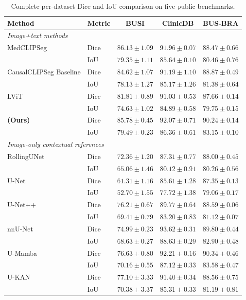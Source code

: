 \begin{table}[p]
\centering
\begin{singlespace}
\renewcommand{\arraystretch}{0.89}
\caption{Complete per-dataset Dice and IoU comparison on five public benchmarks.}
\label{tab:supp_full_model_comparison}
\scriptsize
\setlength{\tabcolsep}{2.9pt}
\begin{tabular}{@{}llccc@{}}
\toprule
Method & Metric & BUSI & ClinicDB & BUS-BRA \\
\midrule
\multicolumn{5}{l}{\textit{Image+text methods}} \\
MedCLIPSeg & Dice & $\mathbf{86.13\pm1.09}$ & $\underline{91.96\pm0.07}$ & $88.47\pm0.66$ \\
 & IoU & $\underline{79.35\pm1.11}$ & $\underline{85.64\pm0.10}$ & $80.46\pm0.76$ \\
CausalCLIPSeg Baseline & Dice & $84.62\pm1.07$ & $91.19\pm1.10$ & $\underline{88.87\pm0.49}$ \\
 & IoU & $78.13\pm1.27$ & $85.17\pm1.26$ & $\underline{81.38\pm0.64}$ \\
LViT & Dice & $81.81\pm0.89$ & $91.03\pm0.53$ & $87.66\pm0.14$ \\
 & IoU & $74.63\pm1.02$ & $84.89\pm0.58$ & $79.75\pm0.15$ \\
\textbf{\methodname{} (Ours)} & Dice & $\underline{85.78\pm0.45}$ & $\mathbf{92.07\pm0.71}$ & $\mathbf{90.24\pm0.14}$ \\
 & IoU & $\mathbf{79.49\pm0.23}$ & $\mathbf{86.36\pm0.61}$ & $\mathbf{83.15\pm0.10}$ \\
\midrule
\multicolumn{5}{l}{\textit{Image-only contextual references}} \\
RollingUNet & Dice & $72.36\pm1.20$ & $87.31\pm0.77$ & $88.00\pm0.45$ \\
 & IoU & $65.06\pm1.46$ & $80.12\pm0.91$ & $80.26\pm0.56$ \\
U-Net & Dice & $61.31\pm1.16$ & $85.61\pm1.28$ & $87.35\pm0.13$ \\
 & IoU & $52.70\pm1.55$ & $77.72\pm1.38$ & $79.06\pm0.17$ \\
U-Net++ & Dice & $76.21\pm0.67$ & $89.77\pm0.64$ & $88.59\pm0.06$ \\
 & IoU & $69.41\pm0.79$ & $83.20\pm0.83$ & $81.12\pm0.07$ \\
nnU-Net & Dice & $74.99\pm0.23$ & $\mathbf{93.62\pm0.31}$ & $\underline{89.80\pm0.44}$ \\
 & IoU & $68.63\pm0.27$ & $\mathbf{88.63\pm0.29}$ & $\underline{82.90\pm0.48}$ \\
U-Mamba & Dice & $\underline{76.63\pm0.80}$ & $\underline{92.21\pm0.16}$ & $\mathbf{90.34\pm0.46}$ \\
 & IoU & $\underline{70.16\pm0.55}$ & $\underline{87.12\pm0.33}$ & $\mathbf{83.58\pm0.47}$ \\
U-KAN & Dice & $\mathbf{77.10\pm3.33}$ & $91.40\pm0.34$ & $88.56\pm0.75$ \\
 & IoU & $\mathbf{70.38\pm3.37}$ & $85.31\pm0.33$ & $81.19\pm0.81$ \\
\bottomrule
\end{tabular}


\end{singlespace}
\end{table}
